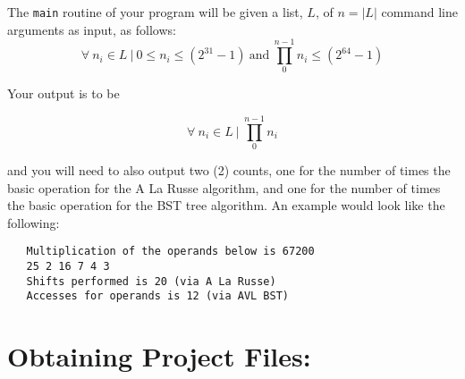 \documentclass[10pt]{article}
\begin{document}
The \verb|main| routine of your program will be given a list, $L$, of $n = |L|$ command line arguments as input, as follows:
\[
   \forall\ n_{i} \in L\ |\  0 \leq n_{i} \leq (2^{31} - 1)\ \textrm{and}\ 
   \prod_{0}^{n-1} n_{i} \leq (2^{64} - 1)
\]

Your output is to be 

\[
   \forall\ n_{i} \in L\ |\ \prod_{0}^{n-1} n_{i}
\]

and you will need to also output two (2) counts, one for the number of times the basic operation for the A La Russe algorithm, and one for the number of times the basic operation for the BST tree algorithm. An example would look like the following:
\begin{Verbatim}
   Multiplication of the operands below is 67200
   25 2 16 7 4 3
   Shifts performed is 20 (via A La Russe)
   Accesses for operands is 12 (via AVL BST)
\end{Verbatim}

\section*{Obtaining Project Files:}
\end{document}
